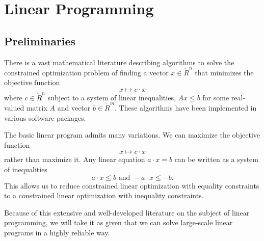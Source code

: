 %
%
%
%
%
%


\section{Linear Programming}


\subsection{Preliminaries}

There is a vast mathematical literature describing algorithms to
solve the constrained optimization problem of finding a vector
$x\in\ring{R}^n$ that minimizes the objective function
    $$x\mapsto c\cdot x$$
where $c\in\ring{R}^n$ subject to a system of linear inequalities,
$A x\le b$ for some real-valued matrix $A$ and vector $b\in
\ring{R}^m$.  These algorithms have been implemented in various
software packages.

The basic linear program admits many variations.  We can maximize
the objective function
$$x \mapsto c\cdot x$$ rather than maximize it.
Any linear equation
    $a\cdot x = b$ can be written as a system of inequalities
        $$a \cdot x \le b \text{ and } -a \cdot x \le -b.$$
This allows us to reduce constrained linear optimization with
equality constraints to a constrained linear optimization with
inequality constraints.

Because of this extensive and well-developed literature on the
subject of linear programming, we will take it as given that we
can solve large-scale linear programs in a highly reliable way.

